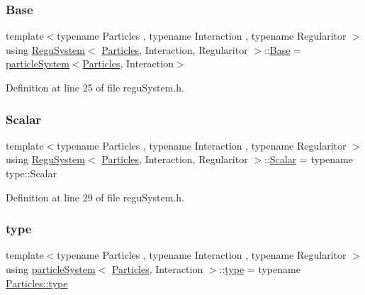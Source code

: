 \subsubsection{\texorpdfstring{Base}{Base}}
{\footnotesize\ttfamily template$<$typename Particles , typename Interaction , typename Regularitor $>$ \\
using \mbox{\hyperlink{class_regu_system}{Regu\+System}}$<$ \mbox{\hyperlink{struct_particles}{Particles}}, Interaction, Regularitor $>$\+::\mbox{\hyperlink{class_regu_system_a03193786fed192f0c8563b38bc883d63}{Base}} =  \mbox{\hyperlink{classparticle_system}{particle\+System}}$<$\mbox{\hyperlink{struct_particles}{Particles}}, Interaction$>$}



Definition at line 25 of file regu\+System.\+h.

\mbox{\label{class_regu_system_afa2cfdbfed4cc8fa879ca715c78ff240}} 
\subsubsection{\texorpdfstring{Scalar}{Scalar}}
{\footnotesize\ttfamily template$<$typename Particles , typename Interaction , typename Regularitor $>$ \\
using \mbox{\hyperlink{class_regu_system}{Regu\+System}}$<$ \mbox{\hyperlink{struct_particles}{Particles}}, Interaction, Regularitor $>$\+::\mbox{\hyperlink{class_regu_system_afa2cfdbfed4cc8fa879ca715c78ff240}{Scalar}} =  typename type\+::\+Scalar}



Definition at line 29 of file regu\+System.\+h.

\mbox{\label{class_regu_system_a7919ed2c8b419f26da20a3bd43ba5fcd}} 
\subsubsection{\texorpdfstring{type}{type}}
{\footnotesize\ttfamily template$<$typename Particles , typename Interaction , typename Regularitor $>$ \\
using \mbox{\hyperlink{classparticle_system}{particle\+System}}$<$ \mbox{\hyperlink{struct_particles}{Particles}}, Interaction $>$\+::\mbox{\hyperlink{classparticle_system_a7919ed2c8b419f26da20a3bd43ba5fcd}{type}} =  typename \mbox{\hyperlink{class_vel_indep_particles_a0c62b43c2f0a50565e5e06587fddee18}{Particles\+::type}}}



